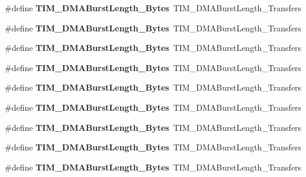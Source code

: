 \begin{DoxyCompactItemize}
\#define {\bfseries T\+I\+M\+\_\+\+D\+M\+A\+Burst\+Length\+\_\+Bytes}~T\+I\+M\+\_\+\+D\+M\+A\+Burst\+Length\+\_\+Transfers
\item 
\mbox{\label{group___t_i_m___legacy_ga2868d400329e705b89c1e425c9cb4fed}} 
\#define {\bfseries T\+I\+M\+\_\+\+D\+M\+A\+Burst\+Length\+\_\+Bytes}~T\+I\+M\+\_\+\+D\+M\+A\+Burst\+Length\+\_\+Transfers
\item 
\mbox{\label{group___t_i_m___legacy_ga99141ca3210700d07d098d161b42cdf3}} 
\#define {\bfseries T\+I\+M\+\_\+\+D\+M\+A\+Burst\+Length\+\_\+Bytes}~T\+I\+M\+\_\+\+D\+M\+A\+Burst\+Length\+\_\+Transfers
\item 
\mbox{\label{group___t_i_m___legacy_ga1a4ab1c8a8469f0d28aafb902615f6db}} 
\#define {\bfseries T\+I\+M\+\_\+\+D\+M\+A\+Burst\+Length\+\_\+Bytes}~T\+I\+M\+\_\+\+D\+M\+A\+Burst\+Length\+\_\+Transfers
\item 
\mbox{\label{group___t_i_m___legacy_ga41a8cee7ca5e9035a04c0920ab0f3f66}} 
\#define {\bfseries T\+I\+M\+\_\+\+D\+M\+A\+Burst\+Length\+\_\+Bytes}~T\+I\+M\+\_\+\+D\+M\+A\+Burst\+Length\+\_\+Transfers
\item 
\mbox{\label{group___t_i_m___legacy_ga79a0397f1c33cc2d0a8b5bdd94eca845}} 
\#define {\bfseries T\+I\+M\+\_\+\+D\+M\+A\+Burst\+Length\+\_\+Bytes}~T\+I\+M\+\_\+\+D\+M\+A\+Burst\+Length\+\_\+Transfers
\item 
\mbox{\label{group___t_i_m___legacy_gae1e210b9c3609e854e05c3594aa01c01}} 
\#define {\bfseries T\+I\+M\+\_\+\+D\+M\+A\+Burst\+Length\+\_\+Bytes}~T\+I\+M\+\_\+\+D\+M\+A\+Burst\+Length\+\_\+Transfers
\item 
\mbox{\label{group___t_i_m___legacy_ga3ca90d9fa3c80590175ba42baac57098}} 
\#define {\bfseries T\+I\+M\+\_\+\+D\+M\+A\+Burst\+Length\+\_\+Bytes}~T\+I\+M\+\_\+\+D\+M\+A\+Burst\+Length\+\_\+Transfers
\item 
\mbox{\label{group___t_i_m___legacy_ga672117a7dafcd778fe8e86db423b07e9}} 
\#define {\bfseries T\+I\+M\+\_\+\+D\+M\+A\+Burst\+Length\+\_\+Bytes}~T\+I\+M\+\_\+\+D\+M\+A\+Burst\+Length\+\_\+Transfers

\end{DoxyCompactItemize}
